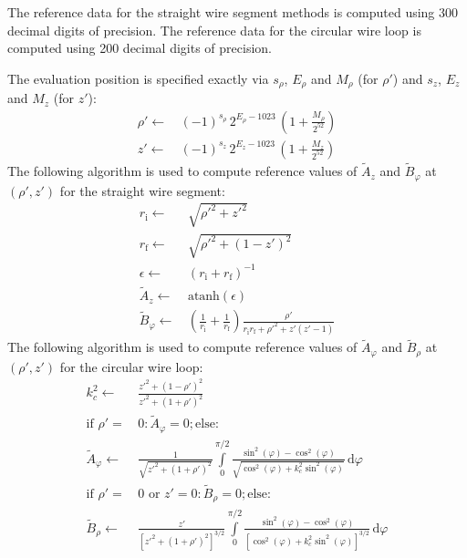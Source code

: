 The reference data for the straight wire segment methods
is computed using 300 decimal digits of precision.
The reference data for the circular wire loop
is computed using 200 decimal digits of precision.


The evaluation position is specified exactly
via $s_\rho$, $E_\rho$ and $M_\rho$ (for $\rho'$)
and $s_z$, $E_z$ and $M_z$ (for $z'$):
\begin{align}
 \rho' \leftarrow&\, (-1)^{s_\rho} \, 2^{E_\rho - 1023} \, \left(1 + \frac{M_\rho}{2^{52}}  \right) \nonumber \\
    z' \leftarrow&\, (-1)^{s_z   } \, 2^{E_z    - 1023} \, \left(1 + \frac{M_z   }{2^{52}}  \right)
\end{align}
The following algorithm is used to compute reference values
of $\tilde{A}_z$ and $\tilde{B}_\varphi$ at~$(\rho', z')$
for the straight wire segment:
\begin{align}
  r_\mathrm{i}  \leftarrow&\, \sqrt{ {\rho'}^2 + {z'}^2 } \nonumber \\
  r_\mathrm{f}  \leftarrow&\, \sqrt{ {\rho'}^2 + \left(1 - z'\right)^2 } \label{alg:sws_ref} \\
  \epsilon \leftarrow&\, \left( r_\mathrm{i} + r_\mathrm{f} \right)^{-1} \nonumber \\
  \tilde{A}_z \leftarrow&\, \textrm{atanh} (\epsilon) \nonumber \\
  \tilde{B}_\varphi \leftarrow&\, \left(\frac{1}{r_\mathrm{i}} + \frac{1}{r_\mathrm{f}} \right) \frac{\rho'}{r_\mathrm{i} r_\mathrm{f} + {\rho'}^2 + z' (z' - 1)} \nonumber
\end{align}
The following algorithm is used to compute reference values
of $\tilde{A}_\varphi$ and $\tilde{B}_\rho$ at~$(\rho', z')$
for the circular wire loop:
\begin{align}
 k_c^2 \leftarrow&\, \frac{{z'}^2 + \left(1 - \rho'\right)^2}{{z'}^2 + \left(1 + \rho'\right)^2} \nonumber \\
 \textrm{if } \rho' =&\, 0 : \tilde{A}_\varphi = 0 ; \textrm{else:} \nonumber \\
 \tilde{A}_\varphi \leftarrow&\,
     \frac{1}{\sqrt{{z'}^2 + \left(1 + \rho'\right)^2}}
                                 \int\limits_0^{\pi/2}
                                   \frac{\sin^2(\varphi) - \cos^2(\varphi)}
                                        {\sqrt{\cos^2(\varphi) + k_c^2 \sin^2(\varphi)}} \,\mathrm{d}\varphi \label{eqn:A_phi_ref} \\
 \textrm{if } \rho' =&\, 0 \textrm{ or } z' = 0 : \tilde{B}_\rho = 0 ; \textrm{else:} \nonumber \\
 \tilde{B}_\rho \leftarrow&\,
    \frac{z'}{\left[{z'}^2 + \left(1 + \rho'\right)^2\right]^{3/2}}
                                 \int\limits_0^{\pi/2}
                                   \frac{\sin^2(\varphi) - \cos^2(\varphi)}
                                        {\left[\cos^2(\varphi) + k_c^2 \sin^2(\varphi)\right]^{3/2}} \,\mathrm{d}\varphi
\end{align}
